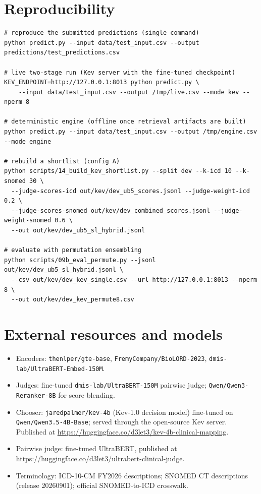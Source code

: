 \documentclass[11pt]{article}
\newcommand{\code}[1]{\texttt{#1}}
\begin{document}
\section{Reproducibility}
\begin{lstlisting}
# reproduce the submitted predictions (single command)
python predict.py --input data/test_input.csv --output predictions/test_predictions.csv

# live two-stage run (Kev server with the fine-tuned checkpoint)
KEV_ENDPOINT=http://127.0.0.1:8013 python predict.py \
    --input data/test_input.csv --output /tmp/live.csv --mode kev --nperm 8

# deterministic engine (offline once retrieval artifacts are built)
python predict.py --input data/test_input.csv --output /tmp/engine.csv --mode engine

# rebuild a shortlist (config A)
python scripts/14_build_kev_shortlist.py --split dev --k-icd 10 --k-snomed 30 \
  --judge-scores-icd out/kev/dev_ub5_scores.jsonl --judge-weight-icd 0.2 \
  --judge-scores-snomed out/kev/dev_combined_scores.jsonl --judge-weight-snomed 0.6 \
  --out out/kev/dev_ub5_sl_hybrid.jsonl

# evaluate with permutation ensembling
python scripts/09b_eval_permute.py --jsonl out/kev/dev_ub5_sl_hybrid.jsonl \
  --csv out/kev/dev_kev_single.csv --url http://127.0.0.1:8013 --nperm 8 \
  --out out/kev/dev_kev_permute8.csv
\end{lstlisting}

\section{External resources and models}
{\small
\begin{itemize}[leftmargin=1.2em]
  \item Encoders: \texttt{thenlper/gte-base}, \texttt{FremyCompany/BioLORD-2023},
  \texttt{dmis-lab/UltraBERT-Embed-150M}.
  \item Judges: fine-tuned \texttt{dmis-lab/UltraBERT-150M} pairwise judge;
  \texttt{Qwen/Qwen3-Reranker-8B} for score blending.
  \item Chooser: \code{jaredpalmer/kev-4b} (Kev-1.0 decision model) fine-tuned on
  \code{Qwen/Qwen3.5-4B-Base}; served through the open-source Kev server. Published at
  \url{https://huggingface.co/d3let3/kev-4b-clinical-mapping}.
  \item Pairwise judge: fine-tuned UltraBERT, published at
  \url{https://huggingface.co/d3let3/ultrabert-clinical-judge}.
  \item Terminology: ICD-10-CM FY2026 descriptions; SNOMED CT descriptions
  (release 20260901); official SNOMED-to-ICD crosswalk.
\end{itemize}
}
\end{document}

